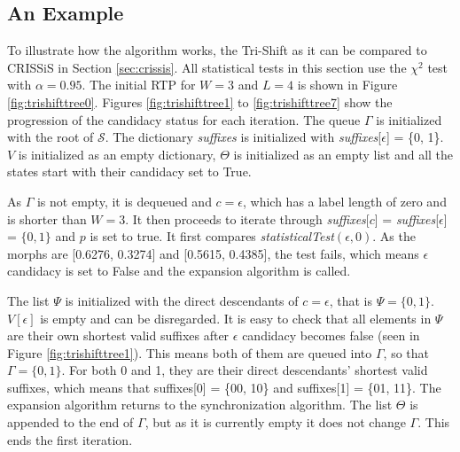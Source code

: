 {\subsection{An Example}

To illustrate how the algorithm works, the Tri-Shift as it can be compared to CRISSiS in Section \ref{sec:crissis}. All statistical tests in this section use the $\chi^2$ test with $\alpha = 0.95$. The initial RTP for $W = 3$ and $L = 4$ is shown in Figure \ref{fig:trishifttree0}. Figures \ref{fig:trishifttree1} to \ref{fig:trishifttree7} show the progression of the candidacy status for each iteration. The queue $\Gamma$ is initialized with the root of $\mathcal{S}$. The dictionary \textit{suffixes} is initialized with  \textit{suffixes}[$\epsilon$] = \{0, 1\}. $V$ is initialized as an empty dictionary, $\Theta$ is initialized as an empty list and all the states start with their candidacy set to True.

As $\Gamma$ is not empty, it is dequeued and $c = \epsilon$, which has a label length of zero and is shorter than $W = 3$. It then proceeds to iterate through \textit{suffixes}[$c$] = \textit{suffixes}[$\epsilon$] = $\{0, 1\}$ and $p$ is set to true. It first compares \textit{statisticalTest}$(\epsilon, 0)$. As the morphs are [0.6276, 0.3274] and [0.5615, 0.4385], the test fails, which means $\epsilon$ candidacy is set to False and the expansion algorithm is called. 

The list $\Psi$ is initialized with the direct descendants of $c = \epsilon$, that is $\Psi = \{0, 1\}$. $V[\epsilon]$ is empty and can be disregarded. It is easy to check that all elements in $\Psi$ are their own shortest valid suffixes after $\epsilon$ candidacy becomes false (seen in Figure \ref{fig:trishifttree1}). This means both of them are queued into $\Gamma$, so that $\Gamma = \{0, 1\}$. For both 0 and 1, they are their direct descendants' shortest valid suffixes, which means that suffixes[0] = \{00, 10\} and suffixes[1] = \{01, 11\}. The expansion algorithm returns to the synchronization algorithm. The list $\Theta$ is appended to the end of $\Gamma$, but as it is currently empty it does not change $\Gamma$. This ends the first iteration. 

}
